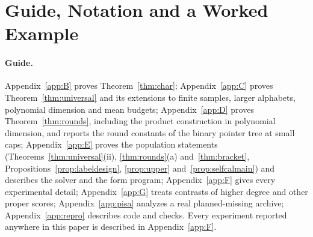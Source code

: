 \section{Guide, Notation and a Worked Example}\label{app:notation}
\paragraph{Guide.}
Appendix~\ref{app:B} proves Theorem~\ref{thm:char}; Appendix~\ref{app:C} proves Theorem~\ref{thm:universal} and its extensions to finite samples, larger alphabets, polynomial dimension and mean budgets; Appendix~\ref{app:D} proves Theorem~\ref{thm:rounds}, including the product construction in polynomial dimension, and reports the round constants of the binary pointer tree at small caps; Appendix~\ref{app:E} proves the population statements (Theorems~\ref{thm:universal}(ii), \ref{thm:rounds}(a) and~\ref{thm:bracket}, Propositions~\ref{prop:labeldesign}, \ref{prop:upper} and~\ref{prop:selfcalmain}) and describes the solver and the form program; Appendix~\ref{app:F} gives every experimental detail; Appendix~\ref{app:G} treats contrasts of higher degree and other proper scores; Appendix~\ref{app:pisa} analyzes a real planned-missing archive; Appendix~\ref{app:repro} describes code and checks. Every experiment reported anywhere in this paper is described in Appendix~\ref{app:F}.

